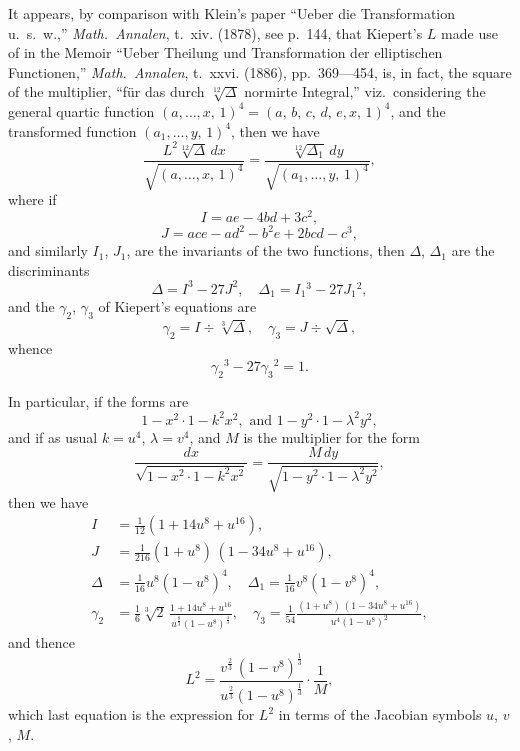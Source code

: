 \documentclass[11pt,a4paper]{book}
\providecommand{\between}{,}
\begin{document}
It appears, by comparison with Klein's paper ``Ueber die Transformation u.~s.~w.,''
\textit{Math.\ Annalen}, t.~xiv. (1878), see p.~144, that Kiepert's $L$ made use of in the
Memoir ``Ueber Theilung und Transformation der elliptischen Functionen,''
\textit{Math.\ Annalen}, t.~xxvi. (1886), pp.~369---454, is, in fact, the square of the multiplier,
``f\"ur das durch $\sqrt[12]{\Delta}$ normirte Integral,'' viz.\ considering the general quartic function
$(a, \ldots \between x,\, 1)^4 = (a,\, b,\, c,\, d,\, e \between x,\, 1)^4$, and the transformed function
$(a_1, \ldots \between y,\, 1)^4$, then we have
\[
\frac{L^2 \sqrt[12]{\Delta}\, dx}{\sqrt{(a, \ldots \between x,\, 1)^4}}
= \frac{\sqrt[12]{\Delta_1}\, dy}{\sqrt{(a_1, \ldots \between y,\, 1)^4}},
\]
where if
\[
I = ae - 4bd + 3c^2,
\]
\[
J = ace - ad^2 - b^2e + 2bcd - c^3,
\]
and similarly $I_1$, $J_1$, are the invariants of the two functions, then $\Delta$, $\Delta_1$ are the
discriminants
\[
\Delta = I^3 - 27J^2, \quad \Delta_1 = I_1{}^3 - 27J_1{}^2,
\]
and the $\gamma_2$, $\gamma_3$ of Kiepert's equations are
\[
\gamma_2 = I \div \sqrt[3]{\Delta}, \quad \gamma_3 = J \div \sqrt{\Delta},
\]
whence
\[
\gamma_2{}^3 - 27\gamma_3{}^2 = 1.
\]

In particular, if the forms are
\[
1 - x^2 \cdot 1 - k^2x^2, \text{ and } 1 - y^2 \cdot 1 - \lambda^2 y^2,
\]
and if as usual $k = u^4$, $\lambda = v^4$, and $M$ is the multiplier for the form
\[
\frac{dx}{\sqrt{1 - x^2 \cdot 1 - k^2x^2}}
= \frac{M\, dy}{\sqrt{1 - y^2 \cdot 1 - \lambda^2 y^2}},
\]
then we have
\begin{align*}
I &= \tfrac{1}{12} (1 + 14u^8 + u^{16}),\\
J &= \tfrac{1}{216} (1 + u^8)\, (1 - 34u^8 + u^{16}),\\
\Delta &= \tfrac{1}{16} u^8 (1 - u^8)^4, \quad
\Delta_1 = \tfrac{1}{16} v^8 (1 - v^8)^4,\\
\gamma_2 &= \tfrac{1}{6} \sqrt[3]{2}\,
\frac{1 + 14u^8 + u^{16}}{u^{\frac{8}{3}} (1 - u^8)^{\frac{4}{3}}}, \quad
\gamma_3 = \tfrac{1}{54}
\frac{(1 + u^8)\, (1 - 34u^8 + u^{16})}{u^4 (1 - u^8)^2},
\end{align*}
and thence
\[
L^2 = \frac{v^{\frac{2}{3}}\, (1 - v^8)^{\frac{1}{3}}}{u^{\frac{2}{3}} (1 - u^8)^{\frac{1}{3}}} \cdot \frac{1}{M},
\]
which last equation is the expression for $L^2$ in terms of the Jacobian symbols $u$, $v$, $M$.
\end{document}
